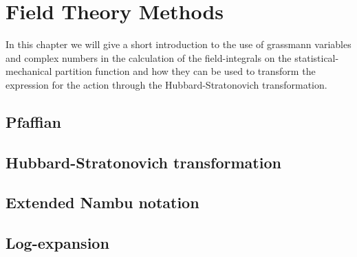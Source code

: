 \chapter{Field Theory Methods}

In this chapter we will give a short introduction to the use of grassmann variables
and complex numbers in the calculation of the field-integrals on the
statistical-mechanical partition function and how they can be used to transform the
expression for the action through the Hubbard-Stratonovich transformation.

\section{Pfaffian}

\section{Hubbard-Stratonovich transformation}

\section{Extended Nambu notation}

\section{Log-expansion}
